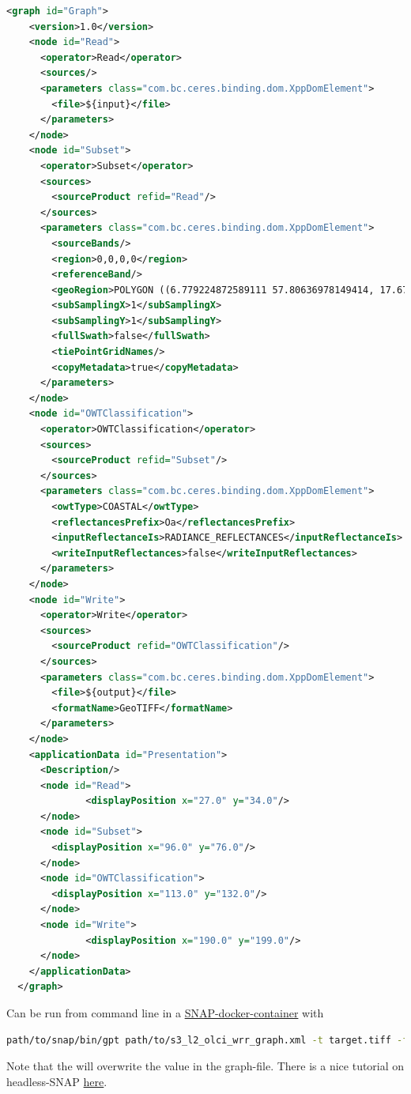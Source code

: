 \begin{lstlisting}[language=xml]
    <graph id="Graph">
    <version>1.0</version>
    <node id="Read">
      <operator>Read</operator>
      <sources/>
      <parameters class="com.bc.ceres.binding.dom.XppDomElement">
        <file>${input}</file>
      </parameters>
    </node>
    <node id="Subset">
      <operator>Subset</operator>
      <sources>
        <sourceProduct refid="Read"/>
      </sources>
      <parameters class="com.bc.ceres.binding.dom.XppDomElement">
        <sourceBands/>
        <region>0,0,0,0</region>
        <referenceBand/>
        <geoRegion>POLYGON ((6.779224872589111 57.80636978149414, 17.677661895751953 57.80636978149414, 17.677661895751953 51.95401382446289, 6.779224872589111 51.95401382446289, 6.779224872589111 57.80636978149414, 6.779224872589111 57.80636978149414))</geoRegion>
        <subSamplingX>1</subSamplingX>
        <subSamplingY>1</subSamplingY>
        <fullSwath>false</fullSwath>
        <tiePointGridNames/>
        <copyMetadata>true</copyMetadata>
      </parameters>
    </node>
    <node id="OWTClassification">
      <operator>OWTClassification</operator>
      <sources>
        <sourceProduct refid="Subset"/>
      </sources>
      <parameters class="com.bc.ceres.binding.dom.XppDomElement">
        <owtType>COASTAL</owtType>
        <reflectancesPrefix>Oa</reflectancesPrefix>
        <inputReflectanceIs>RADIANCE_REFLECTANCES</inputReflectanceIs>
        <writeInputReflectances>false</writeInputReflectances>
      </parameters>
    </node>
    <node id="Write">
      <operator>Write</operator>
      <sources>
        <sourceProduct refid="OWTClassification"/>
      </sources>
      <parameters class="com.bc.ceres.binding.dom.XppDomElement">
        <file>${output}</file>
        <formatName>GeoTIFF</formatName>
      </parameters>
    </node>
    <applicationData id="Presentation">
      <Description/>
      <node id="Read">
              <displayPosition x="27.0" y="34.0"/>
      </node>
      <node id="Subset">
        <displayPosition x="96.0" y="76.0"/>
      </node>
      <node id="OWTClassification">
        <displayPosition x="113.0" y="132.0"/>
      </node>
      <node id="Write">
              <displayPosition x="190.0" y="199.0"/>
      </node>
    </applicationData>
  </graph>  
\end{lstlisting}

Can be run from command line in a \href{https://hub.docker.com/r/mundialis/esa-snap}{SNAP-docker-container} with 
\begin{lstlisting}[language=bash]
    path/to/snap/bin/gpt path/to/s3_l2_olci_wrr_graph.xml -t target.tiff -f GeoTIFF path/to/sourcefile.xml
\end{lstlisting}
Note that the  will overwrite the  value in the graph-file.
There is a nice tutorial on headless-SNAP \href{http://step.esa.int/docs/tutorials/SNAP_CommandLine_Tutorial.pdf}{here}.

